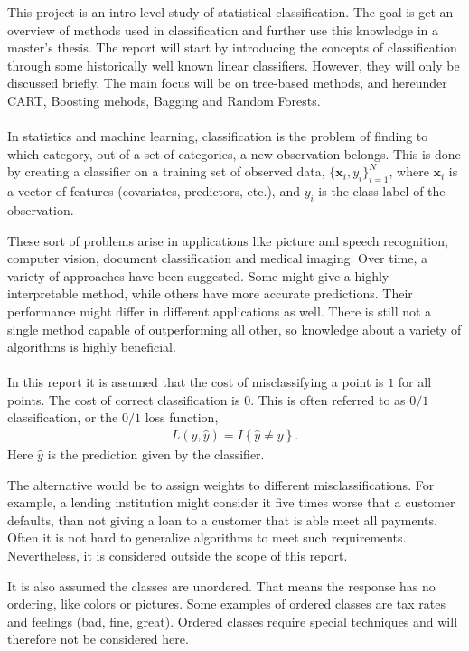 %
This project is an intro level study of statistical classification. The goal is get an overview of methods used in classification and further use this knowledge in a master's thesis. The report will start by introducing the concepts of classification through some historically well known linear classifiers. However, they will only be discussed briefly. The main focus will be on tree-based methods, and hereunder CART, Boosting mehods, Bagging and Random Forests. 
\\
\\
In statistics and machine learning, classification is the problem of finding to which category, out of a set of categories, a new observation belongs. This is done by creating a classifier on a training set of observed data, $\{\mathbf{x}_i, y_i\}_{i = 1}^N$, where $\mathbf{x}_i$ is a vector of features (covariates, predictors, etc.), and $y_i$ is the class label of the observation. 

These sort of problems arise in applications like picture and speech recognition, computer vision, document classification and medical imaging.
Over time, a variety of approaches have been suggested. Some might give a highly interpretable method, while others have more accurate predictions. Their performance might differ in different applications as well. There is still not a single method capable of outperforming all other, so knowledge about a variety of algorithms is highly beneficial. 
\\
\\
In this report it is assumed that the cost of misclassifying a point is $1$ for all points. The cost of correct classification is $0$. This is often referred to as $0/1$ classification, or the $0/1$ loss function, 
\begin{align}
  L(y, \hat y) = I\left\{ \hat y \neq y \right\}.
\end{align}
Here $\hat y$ is the prediction given by the classifier. 

The alternative would be to assign weights to different misclassifications. For example, a lending institution might consider it five times worse that a customer defaults, than not giving a loan to a customer that is able meet all payments. Often it is not hard to generalize algorithms to meet such requirements. Nevertheless,  it is considered outside the scope of this report.

It is also assumed the classes are unordered. That means the response has no ordering, like colors or pictures. Some examples of ordered classes are tax rates and feelings (bad, fine, great). Ordered classes require special techniques and will therefore not be considered here. 



